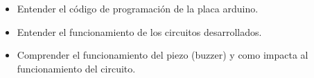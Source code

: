\begin{itemize}
  \item Entender el código de programación de la placa arduino.
  \item Entender el funcionamiento de los circuitos desarrollados.
  \item Comprender el funcionamiento del piezo (buzzer) y como impacta al funcionamiento del circuito.
\end{itemize}
